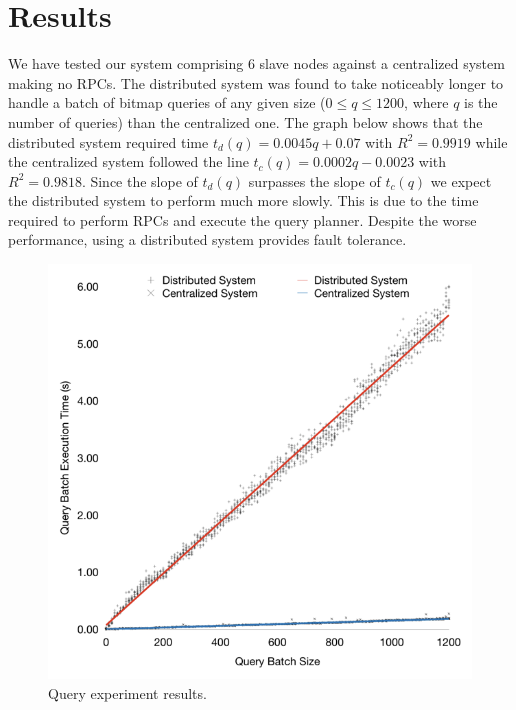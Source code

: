 \section{Results}
We have tested our system comprising 6 slave nodes against a centralized system making no RPCs.
The distributed system was found to take noticeably longer to handle a batch of bitmap queries of any given size
(\(0 \leq q \leq 1200\), where \(q\) is the number of queries) than the centralized one.
The graph below shows that the distributed system required time \(t_d(q) = 0.0045q + 0.07\) with \(R^2 = 0.9919\)
while the centralized system followed the line \(t_c(q) = 0.0002q - 0.0023\) with \(R^2 = 0.9818\).
Since the slope of \(t_d(q)\) surpasses the slope of \(t_c(q)\) we expect the distributed system to perform much more slowly.
This is due to the time required to perform RPCs and execute the query planner.
Despite the worse performance, using a distributed system provides fault tolerance.
\begin{figure}
\centering
\includegraphics[width=\columnwidth]{query-experiment-results}
\caption{Query experiment results.}
\end{figure}
